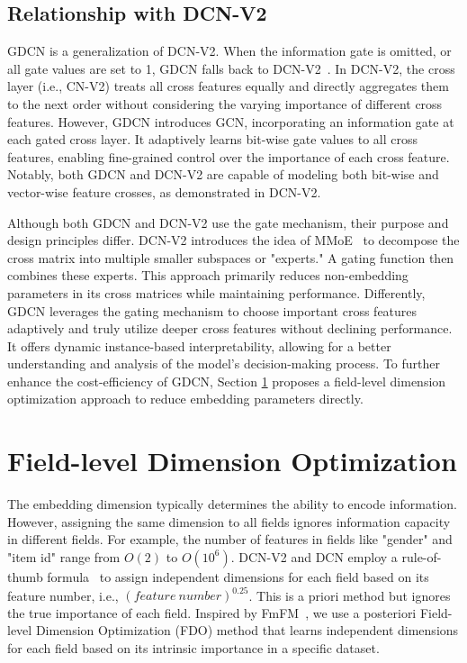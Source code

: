 \documentclass[sigconf]{acmart}
\begin{document}
\subsection{Relationship with DCN-V2} 

GDCN is a generalization of DCN-V2. When the information gate is omitted, or all gate values are set to 1, GDCN falls back to DCN-V2~\cite{wang2021dcnm}. In DCN-V2, the cross layer (i.e., CN-V2) treats all cross features equally and directly aggregates them to the next order without considering the varying importance of different cross features. However, GDCN introduces GCN, incorporating an information gate at each gated cross layer. It adaptively learns bit-wise gate values to all cross features, enabling fine-grained control over the importance of each cross feature. Notably, both GDCN and DCN-V2 are capable of modeling both bit-wise and vector-wise feature crosses, as demonstrated in DCN-V2.



Although both GDCN and DCN-V2 use the gate mechanism, their purpose and design principles differ. DCN-V2 introduces the idea of MMoE~\cite{ma2018mmoe, shazeer2017outrageously} to decompose the cross matrix into multiple smaller subspaces or "experts." A gating function then combines these experts. This approach primarily reduces non-embedding parameters in its cross matrices while maintaining performance. Differently, GDCN leverages the gating mechanism to choose important cross features adaptively and truly utilize deeper cross features without declining performance. It offers dynamic instance-based interpretability, allowing for a better understanding and analysis of the model's decision-making process. To further enhance the cost-efficiency of GDCN, Section \ref{sec:field dimension optimization} proposes a field-level dimension optimization approach to reduce embedding parameters directly.




\section{Field-level Dimension Optimization}
\label{sec:field dimension optimization}
The embedding dimension typically determines the ability to encode information\cite{zhao2021autodim,sun2021fm2}. However, assigning the same dimension to all fields ignores information capacity in different fields. For example, the number of features in fields like "gender" and "item id" range from $O(2)$ to $O(10^6)$. DCN-V2 and DCN employ a rule-of-thumb formula~\cite{wang2021dcnm, Tensorflow} to assign independent dimensions for each field based on its feature number, i.e., $\left( feature\ number \right) ^{0.25}$. This is a priori method but ignores the true importance of each field. Inspired by FmFM~\cite{sun2021fm2}, we use a posteriori Field-level Dimension Optimization (FDO) method that learns independent dimensions for each field based on its intrinsic importance in a specific dataset.
\end{document}
